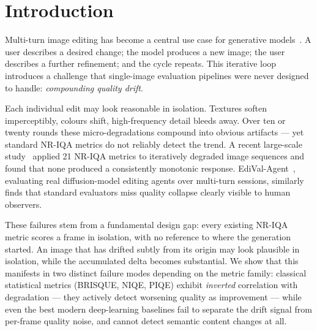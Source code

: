 \documentclass[sigconf]{acmart}
\begin{document}


\maketitle

\section{Introduction}
\label{sec:intro}

Multi-turn image editing has become a central use case for generative
models~\cite{brooks2023instructpix2pix, hertz2022prompttoprompt}.
A user describes a desired change; the model produces a new image;
the user describes a further refinement; and the cycle repeats.
This iterative loop introduces a challenge that single-image evaluation
pipelines were never designed to handle: \emph{compounding quality drift}.

Each individual edit may look reasonable in isolation.
Textures soften imperceptibly, colours shift, high-frequency detail bleeds
away.
Over ten or twenty rounds these micro-degradations compound into obvious
artifacts --- yet standard NR-IQA metrics do not reliably detect the trend.
A recent large-scale study~\cite{banana100_2026} applied 21 NR-IQA metrics
to iteratively degraded image sequences and found that none produced a
consistently monotonic response.
EdiVal-Agent~\cite{edival2026}, evaluating real diffusion-model editing
agents over multi-turn sessions, similarly finds that standard evaluators
miss quality collapse clearly visible to human observers.

These failures stem from a fundamental design gap: every existing NR-IQA
metric scores a frame in isolation, with no reference to where the
generation started.
An image that has drifted subtly from its origin may look plausible in
isolation, while the accumulated delta becomes substantial.
We show that this manifests in two distinct failure modes depending on
the metric family: classical statistical metrics (BRISQUE, NIQE, PIQE)
exhibit \emph{inverted} correlation with degradation --- they actively
detect worsening quality as improvement --- while even the best modern
deep-learning baselines fail to separate the drift signal from per-frame
quality noise, and cannot detect semantic content changes at all.
\end{document}
